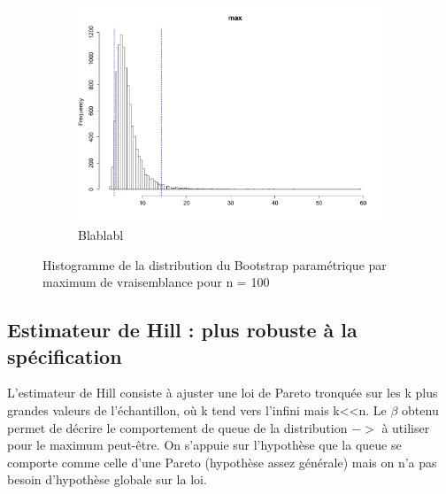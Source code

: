 \documentclass{article}
\renewcommand*{\(}{\left(}
\renewcommand*{\)}{\right)}
\begin{document}
\begin{figure}[H]
\begin{subfigure}[b]{0.3\textwidth}
        \includegraphics[width = \linewidth]{img/BootstrapParamEMV-Max-100.pdf}
        \caption{Blablabl}
        \label{fig:BPEMVMax}
    \end{subfigure}%
    \caption{Histogramme de la distribution du Bootstrap paramétrique par maximum de vraisemblance pour n = 100}
    \label{fig:BPEMV}
\end{figure}


\subsection{Estimateur de Hill : plus robuste à la spécification}
\[  \]
L'estimateur de Hill consiste à ajuster une loi de Pareto tronquée sur les k plus grandes valeurs de l'échantillon, où k tend vers l'infini mais k<<n. Le $\beta$ obtenu permet de décrire le comportement de queue de la distribution $->$ à utiliser pour le maximum peut-être. On s'appuie sur l'hypothèse que la queue se comporte comme celle d'une Pareto (hypothèse assez générale) mais on n'a pas besoin d'hypothèse globale sur la loi.
\end{document}
